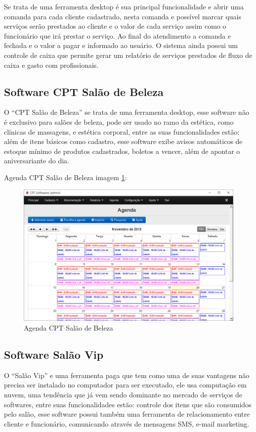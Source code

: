 \documentclass{automatextcc}
\begin{document}
Se trata de uma ferramenta desktop é sua principal funcionalidade e abrir uma comanda para cada cliente cadastrado, nesta comanda e possível marcar quais serviços serão prestados ao cliente e o valor de cada serviço assim como o funcionário que irá prestar o serviço. Ao final do atendimento a comanda e fechada e o valor a pagar e informado ao usuário. O sistema ainda possui um controle de caixa que permite gerar um relatório de serviços prestados de fluxo de caixa e gasto com profissionais. 


\subsection{Software CPT Salão de Beleza}

O “CPT Salão de Beleza” se trata de uma ferramenta desktop, esse software não é exclusivo para salões de beleza, pode ser usado no ramo da estética, como clínicas de massagens, e estética corporal, entre as suas funcionalidades estão: além de itens básicos como cadastro, esse software exibe avisos automáticos de estoque mínimo de produtos cadastrados, boletos a vencer, além de apontar o aniversariante do dia.

  Agenda CPT Salão de Beleza imagem \ref{img6}: 
 \begin{figure}[h!]
    \centering
	\includegraphics[scale=0.3]{agenda-salao}
	\caption{Agenda CPT Salão de Beleza }
	\label{img6}
\end{figure}

\subsection{Software Salão Vip}

O “Salão Vip”  e uma ferramenta paga que tem como uma de suas vantagens não precisa ser instalado no computador para ser executado, ele usa computação em nuvem, uma tendência que já vem sendo dominante no mercado de serviços de softwares, entre suas funcionalidades estão: controle dos itens que são consumidos pelo salão, esse software possui também uma ferramenta de relacionamento entre cliente e funcionário, comunicando através de mensagens SMS, e-mail marketing.
\end{document}
